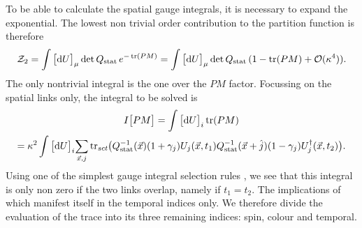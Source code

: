 To be able to calculate the spatial gauge integrals, it is necessary to expand
the exponential. The lowest non trivial order contribution to the partition
function is therefore
%
\begin{equation} \label{eq:single_hop_partition}
  \mathcal{Z}_2 = \int \big[ \mathrm{d} U \big]_{\mu} \det Q_{\text{stat}} \, e^{-\operatorname{tr}(PM)}
    = \int \big[ \mathrm{d} U \big]_{\mu} \det Q_{\text{stat}} \, (1 - \operatorname{tr}(PM) + \mathcal{O}(\kappa^4)).
\end{equation}
%
The only nontrivial integral is the one over the $PM$ factor. Focussing on the
spatial links only, the integral to be solved is
%
\begin{multline}
  I\big[PM\big] = \int \big[ \mathrm{d} U \big]_i \tr(PM) \\
   = \kappa^2 \int \big[ \mathrm{d} U \big]_i \scalemath{0.95}{\sum_{\vec{x}, j}} \tr_{sct} \hskip-.5ex
   \big( \qstat^{-1}(\vec{x})(1+\gamma_j) U_j(\vec{x},t_1) 
   \qstat^{-1}(\vec{x}+\hat{j})(1-\gamma_j)U^{\dagger}_j(\vec{x},t_2) \big).
   \label{eq:second-order-spatial-integral}
\end{multline}
%
Using one of the simplest gauge integral selection rules
, we see that this integral is only non zero
if the two links overlap, namely if $t_1 = t_2$. The implications of which
manifest itself in the temporal indices only. We therefore divide the evaluation
of the trace into its three remaining indices: spin, colour and temporal.

